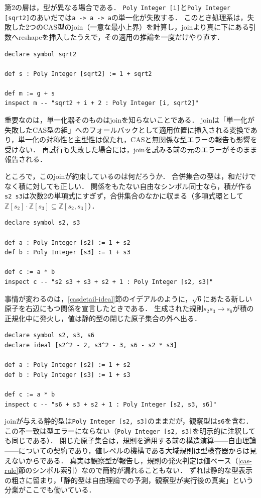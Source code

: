 第2の層は，型が異なる場合である．
\lstinline{Poly Integer [i]}と\lstinline{Poly Integer [sqrt2]}のあいだでは\lstinline{a -> a -> a}の単一化が失敗する．
このとき処理系は，失敗した2つのCAS型のjoin（一意な最小上界）を計算し，joinより真に下にある引数へreshapeを挿入したうえで，その適用の推論を一度だけやり直す．
\begin{lstlisting}[language=egison,numbers=none]
declare symbol sqrt2

def s : Poly Integer [sqrt2] := 1 + sqrt2

def m := g + s
inspect m -- "sqrt2 + i + 2 : Poly Integer [i, sqrt2]"
\end{lstlisting}
重要なのは，単一化器そのものはjoinを知らないことである．
joinは「単一化が失敗したCAS型の組」へのフォールバックとして適用位置に挿入される変換であり，単一化の対称性と主型性は保たれ，CASと無関係な型エラーの報告も影響を受けない．
再試行も失敗した場合には，joinを試みる前の元のエラーがそのまま報告される．

ところで，このjoinが約束しているのは何だろうか．
合併集合の型は，和だけでなく積に対しても正しい．
関係をもたない自由なシンボル同士なら，積が作る\lstinline{s2 s3}は次数2の単項式にすぎず，合併集合のなかに収まる（多項式環として$\mathbb{Z}[s_2] \cdot \mathbb{Z}[s_3] \subseteq \mathbb{Z}[s_2, s_3]$）．
\begin{lstlisting}[language=egison,numbers=none]
declare symbol s2, s3

def a : Poly Integer [s2] := 1 + s2
def b : Poly Integer [s3] := 1 + s3

def c := a * b
inspect c -- "s2 s3 + s3 + s2 + 1 : Poly Integer [s2, s3]"
\end{lstlisting}
事情が変わるのは，\ref{casdetail-ideal}節のイデアルのように，$\sqrt{6}$にあたる新しい原子を右辺にもつ関係を宣言したときである．
生成された規則$s_2 s_3 \to s_6$が積の正規化中に発火し，値は静的型の閉じた原子集合の外へ出る．
\begin{lstlisting}[language=egison,numbers=none]
declare symbol s2, s3, s6
declare ideal [s2^2 - 2, s3^2 - 3, s6 - s2 * s3]

def a : Poly Integer [s2] := 1 + s2
def b : Poly Integer [s3] := 1 + s3

def c := a * b
inspect c -- "s6 + s3 + s2 + 1 : Poly Integer [s2, s3, s6]"
\end{lstlisting}
joinが与える静的型は\lstinline{Poly Integer [s2, s3]}のままだが，観察型は\lstinline{s6}を含む．
この不一致は型エラーにならない（\lstinline{Poly Integer [s2, s3]}を明示的に注釈しても同じである）．
閉じた原子集合は，規則を適用する前の構造演算——自由理論——についての契約であり，値レベルの機構である大域規則は型検査器からは見えないからである．
真実は観察型が報告し，規則の発火判定は値ベース（\ref{cas-rule}節のシンボル索引）なので簡約が漏れることもない．
ずれは静的な型表示の粗さに留まり，「静的型は自由理論での予測，観察型が実行後の真実」という分業がここでも働いている．

